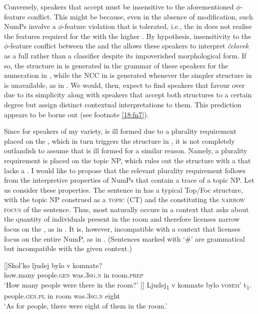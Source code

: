 \documentclass[output=paper,modfonts,newtxmath,hidelinks]{langscibook}
\begin{document}
Conversely, speakers that accept  must be insensitive to the aforementioned ${\phi}${}-feature conflict. This might be because, even in the absence of modification, such NumPs involve a ${\phi}${}-feature violation that is tolerated, i.e., the  in  does not realise the   features required for the  with the higher . By hypothesis, insensitivity to the ${\phi}${}-feature conflict between the  and the  allows these speakers to interpret \textit{čelovek} as a full  rather than a classifier despite its impoverished morphological form. If so, the structure in  is generated in the grammar of these speakers for the numeration in , while the NCC in  is generated whenever the simpler structure in  is unavailable, as in . We would, then, expect to find speakers that favour  over  due to its simplicity along with speakers that accept both structures to a certain degree but assign distinct contextual interpretations to them. This prediction appears to be borne out (see footnote \ref{18:fn7}).
 
Since for speakers of my variety,  is ill formed due to a plurality requirement placed on the , which in turn triggers the structure in , it is not completely outlandish to assume that  is ill formed for a similar reason. Namely, a plurality requirement is placed on the topic NP, which rules out the structure with a  that lacks a  . I would like to propose that the relevant plurality requirement follows from the interpretive properties of NumPs that contain a trace of a topic NP. Let us consider these properties. The sentence in  has a typical Top/Foc structure, with the topic NP construed as a \textsc{ topic} (CT) and the  constituting the \textsc{narrow focus} of the sentence. Thus,  most naturally occurs in a context that asks about the quantity of individuals present in the room and therefore licenses narrow focus on the , as in . It is, however, incompatible with a context that licenses focus on the entire NumP, as in . (Sentences marked with ‘\#’ are grammatical but incompatible with the given context.)

\begin{exe} 
\ex \label{18:ex20}
\begin{xlist}
[]{\gll Skol’ko ljudej bylo v komnate?\\
how.many people.\textsc{gen} was.\textsc{3sg.n} in room.\textsc{prep}\\
	\glt `How many people were there in the room?'
    }
[]{ 
	\gll Ljudej\textsubscript{1}    v   komnate  bylo     \textsc{vosem’}   t\textsubscript{1}.\\
		 people.\textsc{gen.pl} in   room    was.\textsc{3sg.n}  eight  \\
	\glt `As for people, there were eight of them in the room.'
    }
\end{xlist}
\end{exe}
\end{document}

